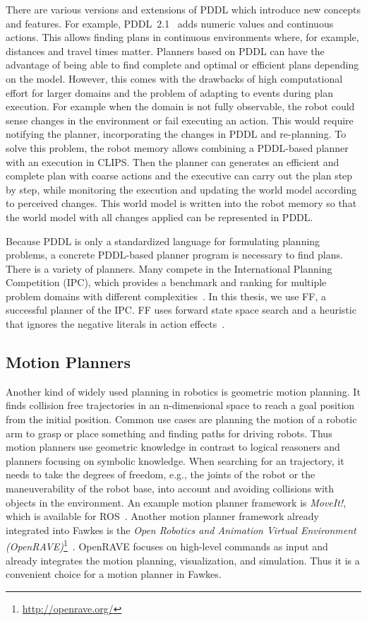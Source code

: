 There are various versions and extensions of PDDL which introduce new
concepts and features. For example, PDDL~2.1~\cite{PDDL2.1} adds
numeric values and continuous actions. This allows finding plans in
continuous environments where, for example, distances and travel times
matter. Planners based on PDDL can have the advantage of being able to find complete and
optimal or efficient plans depending on the model. However, this comes
with the drawbacks of high computational effort for larger domains and
the problem of adapting to events during plan execution. For example
when the domain is not fully observable, the robot could sense changes
in the environment or fail executing an action. This would require
notifying the planner, incorporating the changes in PDDL and
re-planning. To solve this problem, the robot memory allows
combining a PDDL-based planner with an execution in CLIPS. Then the
planner can generates an
efficient and complete plan with coarse actions and the executive can
carry out the plan step by step, while monitoring the execution and updating
the world model according to perceived changes. This world model is
written into the robot memory so that the world model with all changes
applied can be represented in PDDL.

Because PDDL is only a standardized language for formulating planning
problems, a concrete PDDL-based planner program is necessary to find plans. There
is a variety of planners. Many compete in the International
Planning Competition (IPC), which provides a benchmark and ranking for
multiple problem domains with different
complexities~\cite{planning-competition}. In this thesis, we use FF, a successful
planner of the IPC. FF uses
forward state space search and a heuristic that ignores the negative
literals in action effects~\cite{hoffmannFF}.

\subsection{Motion Planners}
Another kind of widely used planning in robotics is geometric motion
planning. It finds collision free trajectories in an n-dimensional
space to reach a goal position from the initial position. Common use cases
are planning the motion of a robotic arm to grasp or place something
and finding paths for driving robots. Thus motion planners use geometric
knowledge in contrast to logical reasoners and planners focusing on
symbolic knowledge.  When searching for an trajectory, it needs to take the degrees of
freedom, e.g., the joints of the robot or the maneuverability of the
robot base, into account and avoiding collisions with objects in the
environment. An example motion planner framework is \emph{MoveIt!},
which is available for ROS~\cite{MoveIt}. Another motion planner
framework already integrated into Fawkes is the \emph{Open Robotics
  and Animation Virtual Environment
  (OpenRAVE)}\footnote{\url{http://openrave.org/}}~\cite{OpenRave}. OpenRAVE
focuses on high-level commands as input and already integrates the
motion planning, visualization, and simulation. Thus it is a
convenient choice for a motion planner in Fawkes.

